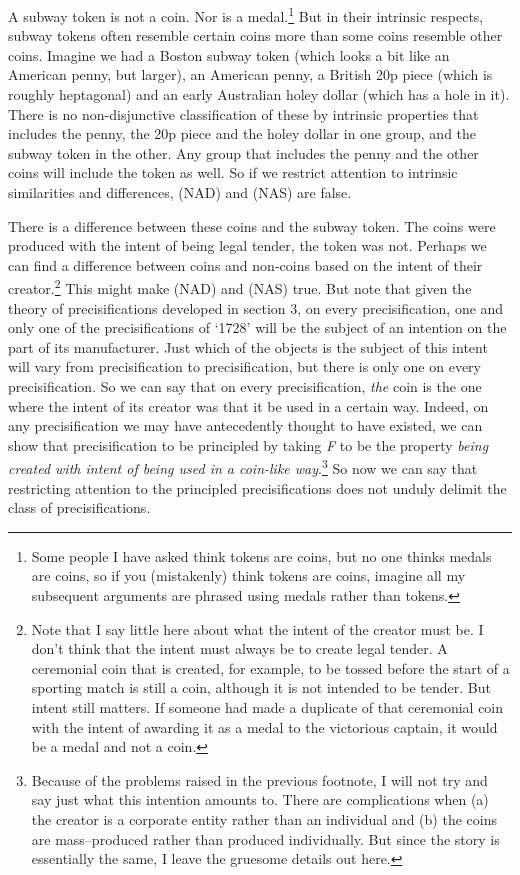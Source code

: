 A subway token is not a coin. Nor is a medal.\footnote{Some people I have asked think tokens are coins, but no one thinks medals are coins, so if you (mistakenly) think tokens are coins, imagine all my subsequent arguments are phrased using medals rather than tokens.} But in their intrinsic respects, subway tokens often resemble certain coins more than some coins resemble other coins. Imagine we had a Boston subway token (which looks a bit like an American penny, but larger), an American penny, a British 20p piece (which is roughly heptagonal) and an early Australian holey dollar (which has a hole in it). There is no non-disjunctive classification of these by intrinsic properties that includes the penny, the 20p piece and the holey dollar in one group, and the subway token in the other. Any group that includes the penny and the other coins will include the token as well. So if we restrict attention to intrinsic similarities and differences, (NAD) and (NAS) are false.

There is a difference between these coins and the subway token. The coins were produced with the intent of being legal tender, the token was not. Perhaps we can find a difference between coins and non-coins based on the intent of their creator.\footnote{Note that I say little here about what the intent of the creator must be. I don't think that the intent must always be to create legal tender. A ceremonial coin that is created, for example, to be tossed before the start of a sporting match is still a coin, although it is not intended to be tender. But intent still matters. If someone had made a duplicate of that ceremonial coin with the intent of awarding it as a medal to the victorious captain, it would be a medal and not a coin.} This might make (NAD) and (NAS) true. But note that given the theory of precisifications developed in section 3, on every precisification, one and only one of the precisifications of `1728' will be the subject of an intention on the part of its manufacturer. Just which of the objects is the subject of this intent will vary from precisification to precisification, but there is only one on every precisification. So we can say that on every precisification, \textit{the} coin is the one where the intent of its creator was that it be used in a certain way. Indeed, on any precisification we may have antecedently thought to have existed, we can show that precisification to be principled by taking \textit{F} to be the property \textit{being created with intent of being used in a coin-like way}.\footnote{Because of the problems raised in the previous footnote, I will not try and say just what this intention amounts to. There are complications when (a) the creator is a corporate entity rather than an individual and (b) the coins are mass--produced rather than produced individually. But since the story is essentially the same, I leave the gruesome details out here.} So now we can say that restricting attention to the principled precisifications does not unduly delimit the class of precisifications.


